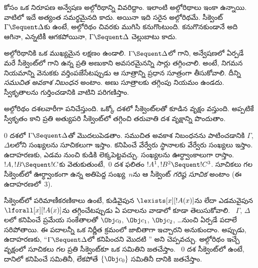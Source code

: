 \documentclass[../../../include/open-logic-section]{subfiles}
\begin{document}


 కోసం ఒక నిరూపణ అన్వేషణ అల్గోరిథాన్ని వివరిద్దాం. ఇలాంటి అల్గోరిథాలు ఇంకా ఉన్నాయి. వాటిలో ఇదే అత్యంత సమర్థమైనది కాదు. అయినా ఇది సరైన అల్గోరిథమే. సీక్వెంట్~$\Gamma \Sequent \Delta$కు  ఉంటే, అల్గోరిథం చివరకు ముగిసి  కనుగొంటుంది.  కనుగొనకుండానే అది ఆగినా, ఎన్నటికీ ఆగకపోయినా, $\Gamma
\Sequent \Delta$ చెల్లుబాటు కాదు.

అల్గోరిథానికి ఒక ముఖ్యమైన లక్షణం ఉండాలి. $\Gamma \Sequent \Delta$లో గాని, అన్వేషణలో ఏర్పడే మరే సీక్వెంట్‌లో గాని ఉన్న ప్రతి అణుకాని  అవసరమైనన్ని సార్లు తగ్గించాలి. అంటే, నిగమన నియమాన్ని వెనుకకు వర్తింపజేసేటప్పుడు ఆ సూత్రాన్ని ప్రధాన సూత్రంగా తీసుకోవాలి. దీన్ని \emph{సముచిత అవకాశ నిబంధన} అంటాం. అణు సూత్రాలకు తగ్గింపు నియమం ఉండదు. స్వీకృతాలను గుర్తించడానికి వాటిని పరిగణిస్తాం.

అల్గోరిథం దశలవారీగా పనిచేస్తుంది. ఒక్కో దశలో సీక్వెంట్‌లతో కూడిన వృక్షం వస్తుంది. అప్పటికే స్వీకృతం కాని ప్రతి అత్యుపరి సీక్వెంట్‌లో  తగ్గించి తరువాతి దశ వృక్షాన్ని పొందుతాం.

$0$ దశలో $\Gamma \Sequent \Delta$తో మొదలుపెడతాం. సముచిత అవకాశ నిబంధనను పాటించడానికి $\Gamma$, $\Delta$లలోని  సంఖ్యలను సూచికలుగా ఇస్తాం.  కనిపించే వేర్వేరు స్థానాలకు వేర్వేరు సంఖ్యలు ఇస్తాం. ఉదాహరణకు,  ఎడమ నుంచి కుడికి లెక్కపెట్టవచ్చు. సంఖ్యలను ఊర్ధ్వాంకాలుగా రాస్తాం. $!A, !B \Sequent !C$కు  వెతుకుతుంటే,~$0$ దశ ఫలితం $!A^1, !B^2 \Sequent !C^3$. సూచికలు గల సీక్వెంట్‌లో ఊర్ధ్వాంకంగా ఉన్న అతిపెద్ద సంఖ్య~$n$ను ఆ సీక్వెంట్ \emph{గరిష్ఠ సూచిక} అంటాం (ఈ ఉదాహరణలో~$3$).

సీక్వెంట్‌లో పరిమాణీకరణికాలు ఉంటే, కుడివైపున $\lexists[x][!A(x)]$ను లేదా ఎడమవైపున $\lforall[x][!A(x)]$ను తగ్గించేటప్పుడు ఏ పదాలను వాడాలో కూడా తెలుసుకోవాలి. ~$\Gamma$, $\Delta$లలో కనిపించే ప్రమేయ సంకేతాలతో  $\Obj c_0$, $\Obj c_1$, $\Obj c_2$, \dots నుంచి ఏర్పడే పదాలే సరిపోతాయి. ఈ పదాలన్నీ ఒక నిర్ణీత క్రమంలో జాబితాగా ఇచ్చారని అనుకుందాం. అప్పుడు, ఉదాహరణకు, “$\Gamma \Sequent \Delta$లో కనిపించని మొదటి ” అని చెప్పవచ్చు. అల్గోరిథం ఇచ్చే వృక్షంలో సూచికలు గల ప్రతి సీక్వెంట్‌కూ ఒక  సమితిని జతచేస్తాం. ~$0$ దశ సీక్వెంట్‌లో  ఉంటే, దానిలో కనిపించే  సమితినీ,  లేకపోతే $\{\Obj c_0\}$ సమితినీ దానికి జతచేస్తాం.
\end{document}
